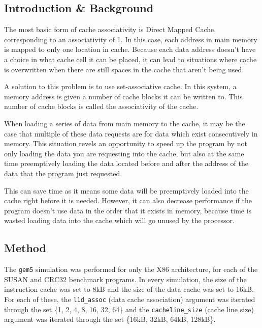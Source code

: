 
\subsection{Introduction \& Background}

The most basic form of cache associativity is Direct Mapped Cache, corresponding to an
associativity of 1.
In this case, each address in main memory is mapped to only one location in cache.
Because each data address doesn't have a choice in what cache cell it can be placed,
it can lead to situations where cache is overwritten when there are still spaces in
the cache that aren't being used.

A solution to this problem is to use set-associative cache.
In this system, a memory address is given a number of cache blocks it can be written to.
This number of cache blocks is called the associativity of the cache.

When loading a series of data from main memory to the cache, it may be the case that
multiple of these data requests are for data which exist consecutively in memory.
This situation revels an opportunity to speed up the program by not only loading
the data you are requesting into the cache, but also at the same time preemptively loading
the data located before and after the address of the data that the program just requested.

This can save time as it means some data will be preemptively loaded into the cache right
before it is needed.
However, it can also decrease performance if the program doesn't use data in the order that
it exists in memory, because time is wasted loading data into the cache which will go unused
by the processor.

\subsection{Method}

The \texttt{gem5} simulation was performed for only the X86 architecture, for each of the
SUSAN and CRC32 benchmark programs.
In every simulation, the size of the instruction cache was set to 8kB and the size
of the data cache was set to 16kB.
For each of these, the \texttt{l1d\_assoc} (data cache association) argument was iterated
through the set \{1, 2, 4, 8, 16, 32, 64\} and the \texttt{cacheline\_size} (cache line size) argument
was iterated through the set \{16kB, 32kB, 64kB, 128kB\}.

